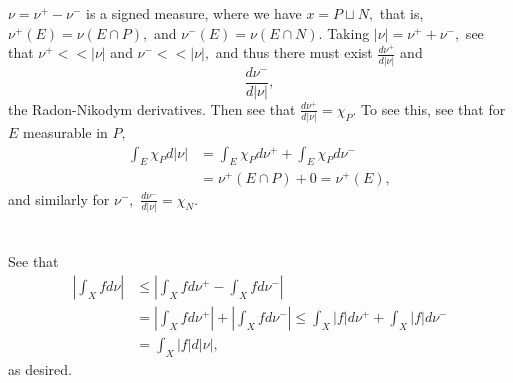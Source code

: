 \documentclass{article}
\begin{document}
\section{} %
$\nu=\nu^+-\nu^-$ is a signed measure, where we have $x=P \sqcup N,$ that is, $\nu^+(E)=\nu(E \cap P),$ and $\nu^-(E)=\nu(E \cap N).$
Taking $|\nu|=\nu^+ +\nu^-,$ see that $ \nu^+ << |\nu|$ and $\nu^- << |\nu|,$ and thus there must exist $\frac{d\nu^+}{d|\nu|}$ and 
$$\frac{d\nu^-}{d|\nu|},$$ the Radon-Nikodym derivatives. Then see that $\frac{d\nu^+}{d|\nu|}=\chi_P.$ To see this, see that for $E$ measurable in $P,$
\begin{align*}
	\int_E \chi_{P}d|\nu| &= \int_E \chi_P d\nu^+ + \int_E \chi_P d\nu^-\\
	&= \nu^+(E\cap P)  + 0 = \nu^+(E),
\end{align*}
and similarly for $\nu^-,$ $\frac{d\nu^-}{d|\nu|}=\chi_N.$ 
\section{} %
See that \begin{align*}
	\left| \int_X f d\nu \right| &\leq \left|\int_{X}f d\nu^+ - \int_{X}f d\nu^-  \right|\\
	&= \left|\int_{X}f d\nu^+\right| + \left|\int_{X}f d\nu^-\right| \leq \int_{X}|f| d\nu^+ + \int_{X}|f| d\nu^-\\
	&= \int_{X}|f| d|\nu|,
\end{align*}
as desired. 
\section{} %
\end{document}
